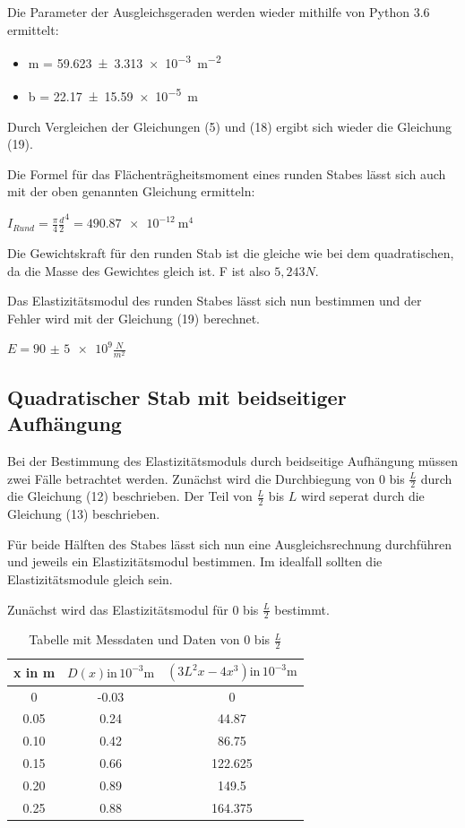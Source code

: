 Die Parameter der Ausgleichsgeraden werden wieder mithilfe von Python 3.6 ermittelt:

\begin{itemize}
  \item m = \SI{59.623(3313)e-3}{\meter\tothe{-2}}
  \item b = \SI{22.17(1559)e-5}{\meter}
\end{itemize}

Durch Vergleichen der Gleichungen (5) und (18) ergibt sich wieder die Gleichung (19).

Die Formel für das Flächenträgheitsmoment eines runden Stabes lässt sich auch mit
der oben genannten Gleichung ermitteln:\\

\centerline{$I_{Rund} = \frac{\pi}{4} \frac{d}{2}^4 = \SI{490.87e-12}{\meter\tothe{4}}$}

Die Gewichtskraft für den runden Stab ist die gleiche wie bei dem quadratischen,
da die Masse des Gewichtes gleich ist. F ist also $5,243N$.

Das Elastizitätsmodul des runden Stabes lässt sich nun bestimmen und der Fehler
wird mit der Gleichung (19) berechnet.\\

\centerline{$E = \num{90(5)e9} \frac{N}{m^2}$}

\subsection{Quadratischer Stab mit beidseitiger Aufhängung}

Bei der Bestimmung des Elastizitätsmoduls durch beidseitige Aufhängung müssen zwei
Fälle betrachtet werden. Zunächst wird die Durchbiegung von $0$ bis $\frac{L}{2}$
durch die Gleichung (12) beschrieben. Der Teil von $\frac{L}{2}$ bis $L$ wird seperat
durch die Gleichung (13) beschrieben.

Für beide Hälften des Stabes lässt sich nun eine Ausgleichsrechnung durchführen
und jeweils ein Elastizitätsmodul bestimmen. Im idealfall sollten die
Elastizitätsmodule gleich sein.

Zunächst wird das Elastizitätsmodul für $0$ bis $\frac{L}{2}$ bestimmt.

\begin{table}
  \centering
  \caption{Tabelle mit Messdaten und Daten von $0$ bis $\frac{L}{2}$}
  \begin{tabular}{c c c}
    \toprule
    x in \si{\meter} & $D(x) \text{in} \, 10^{-3} \si{\meter}$ &
    $ \left( 3L^2x-4x^3 \right) \text{in} \, 10^{-3} \si{\meter}$\\
    \midrule
    0    & -0.03 & 0 \\
    0.05 & 0.24 & 44.87 \\
    0.10 & 0.42 & 86.75 \\
    0.15 & 0.66 & 122.625 \\
    0.20 & 0.89 & 149.5 \\
    0.25 & 0.88 & 164.375 \\
    \bottomrule
  \end{tabular}
\end{table}

